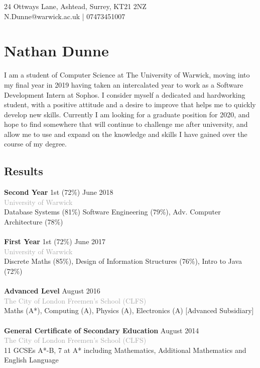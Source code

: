 \documentclass[11pt]{article}
\newcommand{\linesep}{\noindent\makebox[\linewidth]{\rule{\linewidth}{0.2pt}}}
\begin{document}
\hspace*{\fill} 24 Ottways Lane, Ashtead, Surrey, KT21 2NZ \\
\hspace*{\fill} N.Dunne@warwick.ac.uk | 07473451007
\section*{Nathan Dunne}
I am a student of Computer Science at The University of Warwick, moving into my final year in 2019 having taken an intercalated year to work as a Software Development Intern at Sophos. I consider myself a dedicated and hardworking student, with a positive attitude and a desire to improve that helps me to quickly develop new skills. Currently I am looking for a graduate position for 2020, and hope to find somewhere that will continue to challenge me after university, and allow me to use and expand on the knowledge and skills I have gained over the course of my degree.

\linesep
\subsection*{Results}

\textbf{Second Year} \hfill 1st (72\%) \hfill June 2018 \\
\textcolor{darkgray}{University of Warwick} \\
\hspace*{4ex}Database Systems (81\%) Software Engineering (79\%), Adv. Computer Architecture (78\%)
\\\\
\textbf{First Year} \hfill \hspace{1em} 1st (72\%) \hfill June 2017 \\    
\textcolor{darkgray}{University of Warwick} \\
\hspace*{4ex}Discrete Maths (85\%), Design of Information Structures (76\%), Intro to Java (72\%)
\\\\
\textbf{Advanced Level} \hfill August 2016 \\
\textcolor{darkgray}{The City of London Freemen’s School (CLFS)} \\                    
\hspace*{4ex}Maths (A*), Computing (A), Physics (A), Electronics (A) [Advanced Subsidiary]
\\\\
\textbf{General Certificate of Secondary Education} \hfill August 2014 \\
\textcolor{darkgray}{The City of London Freemen’s School (CLFS)} \\  
\hspace*{4ex}11 GCSEs A*-B, 7 at A* including Mathematics, Additional Mathematics and English Language
\\
 \linesep
\end{document}
